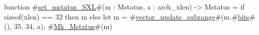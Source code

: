 function #\hyperref[sailRISCVzsetzymstatuszySXL]{set\_mstatus\_SXL}#(m : Mstatus, a : arch_xlen) -> Mstatus = {
  if   sizeof(xlen) == 32
  then m
  else {
    let m = #\hyperref[sailRISCVzvectorzyupdatezysubrange]{vector\_update\_subrange}#(m.#\hyperref[sailRISCVzbits]{bits}#(), 35, 34,  a);
    #\hyperref[sailRISCVzMkzyMstatus]{Mk\_Mstatus}#(m)
  }
}
